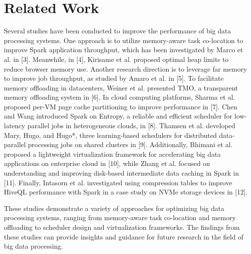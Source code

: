 \section{Related Work}

Several studies have been conducted to improve the performance of big
data processing systems. One approach is to utilize memory-aware task
co-location to improve Spark application throughput, which has been
investigated by Marco et al. in [3]. Meanwhile, in [4], Kirisame et
al. proposed optimal heap limits to reduce browser memory use. Another
research direction is to leverage far memory to improve job
throughput, as studied by Amaro et al. in [5]. To facilitate memory
offloading in datacenters, Weiner et al. presented TMO, a transparent
memory offloading system in [6]. In cloud computing platforms, Sharma
et al. proposed per-VM page cache partitioning to improve performance
in [7]. Chen and Wang introduced Spark on Entropy, a reliable and
efficient scheduler for low-latency parallel jobs in heterogeneous
clouds, in [8]. Thamsen et al. developed Mary, Hugo, and Hugo*, three
learning-based schedulers for distributed data-parallel processing
jobs on shared clusters in [9]. Additionally, Bhimani et al. proposed
a lightweight virtualization framework for accelerating big data
applications on enterprise cloud in [10], while Zhang et al. focused
on understanding and improving disk-based intermediate data caching in
Spark in [11]. Finally, Intasorn et al. investigated using compression
tables to improve HiveQL performance with Spark in a case study on
NVMe storage devices in [12]. 

These studies demonstrate a variety of approaches for optimizing big
data processing systems, ranging from memory-aware task co-location
and memory offloading to scheduler design and virtualization
frameworks. The findings from these studies can provide insights and
guidance for future research in the field of big data processing.
